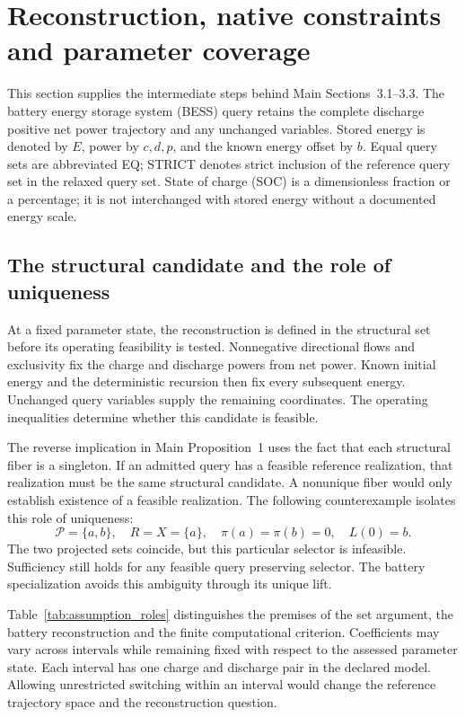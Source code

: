 \section{Reconstruction, native constraints and parameter coverage}\label{sec:reconstruction}
This section supplies the intermediate steps behind Main Sections~3.1--3.3.
The battery energy storage system (BESS) query retains the complete discharge
positive net power trajectory and any unchanged variables. Stored energy is
denoted by $E$, power by $c,d,p$, and the known energy offset by $b$.
Equal query sets are abbreviated EQ; STRICT denotes strict inclusion of the reference query set in the relaxed query set.
State of charge (SOC) is a dimensionless fraction or a percentage; it is not
interchanged with stored energy without a documented energy scale.

\subsection{The structural candidate and the role of uniqueness}
At a fixed parameter state, the reconstruction is defined in the structural
set before its operating feasibility is tested. Nonnegative directional flows
and exclusivity fix the charge and discharge powers from net power. Known
initial energy and the deterministic recursion then fix every subsequent
energy. Unchanged query variables supply the remaining coordinates.
The operating inequalities determine whether this candidate is feasible.

The reverse implication in Main Proposition~1 uses the fact that each
structural fiber is a singleton. If an admitted query has a feasible reference
realization, that realization must be the same structural candidate. A
nonunique fiber would only establish existence of a feasible realization.
The following counterexample isolates this role of uniqueness:
\begin{equation}
\mathcal P=\{a, b\},\quad R=X=\{a\},\quad
\pi(a)=\pi(b)=0,\quad L(0)=b .\label{eq:nonunique}
\end{equation}
The two projected sets coincide, but this particular selector is infeasible.
Sufficiency still holds for any feasible query preserving selector. The
battery specialization avoids this ambiguity through its unique lift.


Table~\ref{tab:assumption_roles} distinguishes the premises of the set argument,
the battery reconstruction and the finite computational criterion. Coefficients
may vary across intervals while remaining fixed with respect to the assessed
parameter state. Each interval has one charge and discharge pair in the
declared model. Allowing unrestricted switching within an interval would
change the reference trajectory space and the reconstruction question.

